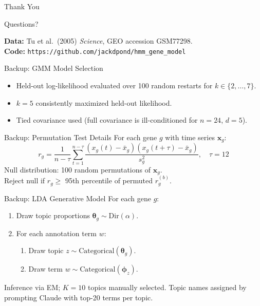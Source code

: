 \documentclass[12pt]{beamer}
\begin{document}
\begin{frame}{Thank You}
  \begin{center}
    \large Questions?
  \end{center}

  \bigskip
  \small
  \textbf{Data:} Tu et al.\ (2005) \textit{Science}, GEO accession GSM77298.\\
  \textbf{Code:} \texttt{https://github.com/jackdpond/hmm\_gene\_model}
  
\end{frame}

\appendix

\begin{frame}{Backup: GMM Model Selection}
  \begin{itemize}
    \item Held-out log-likelihood evaluated over 100 random restarts for
          $k \in \{2,\ldots,7\}$.
    \item $k=5$ consistently maximized held-out likelihood.
    \item Tied covariance used (full covariance is ill-conditioned for
          $n=24$, $d=5$).
  \end{itemize}
\end{frame}

\begin{frame}{Backup: Permutation Test Details}
  For each gene $g$ with time series $\mathbf{x}_g$:
  \[
    r_g = \frac{1}{n - \tau}
          \sum_{t=1}^{n-\tau}
          \frac{(x_g(t) - \bar{x}_g)(x_g(t+\tau) - \bar{x}_g)}{s_g^2},
    \quad \tau = 12
  \]
  Null distribution: 100 random permutations of $\mathbf{x}_g$.\\
  Reject null if $r_g \geq$ 95th percentile of permuted $r_g^{(b)}$.
\end{frame}

\begin{frame}{Backup: LDA Generative Model}
  For each gene $g$:
  \begin{enumerate}
    \item Draw topic proportions $\bm{\theta}_g \sim \text{Dir}(\alpha)$.
    \item For each annotation term $w$:
      \begin{enumerate}
        \item Draw topic $z \sim \text{Categorical}(\bm{\theta}_g)$.
        \item Draw term $w \sim \text{Categorical}(\bm{\phi}_z)$.
      \end{enumerate}
  \end{enumerate}
  Inference via EM; $K=10$ topics manually selected. Topic names assigned by prompting Claude with top-20 terms
  per topic.
\end{frame}
\end{document}
